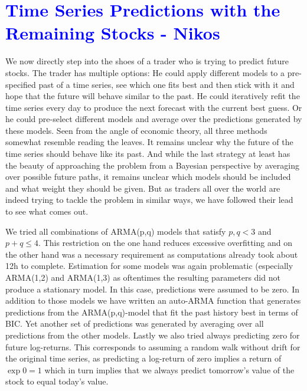 
\section{\textcolor{blue}{Time Series Predictions with the Remaining Stocks - Nikos}}

We now directly step into the shoes of a trader who is trying to  predict future stocks. The trader has multiple options: He could apply different models to a pre-specified past of a time series, see which one fits best and then stick with it and hope that the future will behave similar to the past. He could iteratively refit the time series every day to produce the next forecast with the current best guess. Or he could pre-select different models and average over the predictions generated by these models. Seen from the angle of economic theory, all three methods somewhat resemble reading the leaves. It remains unclear why the future of the time series should behave like its past. And while the last strategy at least has the beauty of approaching the problem from a Bayesian perspective by averaging over possible future paths, it remains unclear which models should be included and what weight they should be given. But as traders all over the world are indeed trying to tackle the problem in similar ways, we have followed their lead to see what comes out. 

We tried all combinations of ARMA(p,q) models that satisfy $p,q < 3$ and $p+q \leq 4$. This restriction on the one hand reduces excessive overfitting and on the other hand was a necessary requirement as computations already took about 12h to complete. Estimation for some models was again problematic (especially ARMA(1,2) and ARMA(1,3) as oftentimes the resulting parameters did not produce a stationary model. In this case, predictions were assumed to be zero. In addition to those models we have written an auto-ARMA function that generates predictions from the ARMA(p,q)-model that fit the past history best in terms of BIC. Yet another set of predictions was generated by averaging over all predictions from the other models. Lastly we also tried always predicting zero for future log-returns. This corresponds to assuming a random walk without drift for the original time series, as predicting a log-return of zero implies a return of $\exp{0} = 1$ which in turn implies that we always predict tomorrow's value of the stock to equal today's value. 

